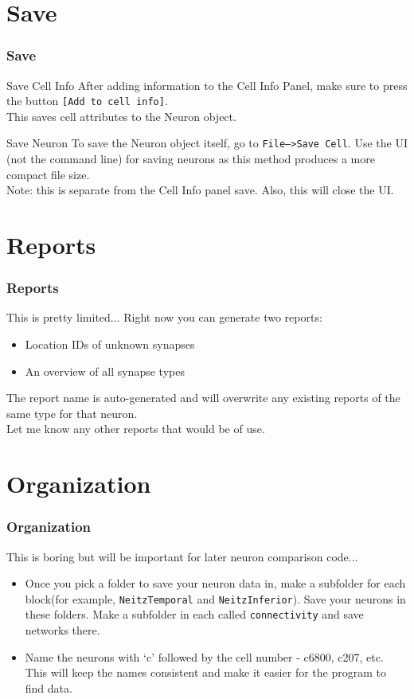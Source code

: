 \documentclass[11pt]{beamer}
\begin{document}
\section{Save}
	\begin{frame}
		\frametitle{Save}
		\begin{block}{Save Cell Info}
			After adding information to the Cell Info Panel, make sure to press the button \texttt{[Add to cell info]}.\\ This saves cell attributes to the Neuron object.
		\end{block}
		\begin{block}{Save Neuron}
			To save the Neuron object itself, go to \texttt{File-->Save Cell}. Use the UI (not the command line) for saving neurons as this method produces a more compact file size.\\ Note: this is separate from the Cell Info panel save. Also, this will close the UI.  
		\end{block}
	\end{frame}

	\section{Reports}
	\begin{frame}
		\frametitle{Reports}
		This is pretty limited... Right now you can generate two reports:
		\begin{itemize} 
			\item Location IDs of unknown synapses
			\item An overview of all synapse types
		\end{itemize}
		 The report name is auto-generated and will overwrite any existing reports of the same type for that neuron.\\Let me know any other reports that would be of use.
	\end{frame}
\section{Organization}
\begin{frame}
	\frametitle{Organization}
	This is boring but will be important for later neuron comparison code...
	\begin{itemize}
		\item Once you pick a folder to save your neuron data in, make a subfolder for each block(for example, \texttt{NeitzTemporal} and \texttt{NeitzInferior}). Save your neurons in these folders. Make a subfolder in each called \texttt{connectivity} and save networks there.
		\item Name the neurons with `c' followed by the cell number - c6800, c207, etc. This will keep the names consistent and make it easier for the program to find data.
	\end{itemize}
\end{frame}
\end{document}
